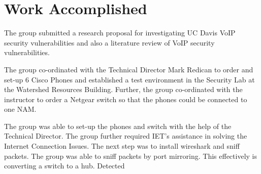\section{Work Accomplished}


The group submitted a research proposal for investigating UC Davis VoIP security vulnerabilities and also a literature review of VoIP security vulnerabilities.

 The group co-ordinated with the Technical Director Mark Redican to order and set-up 6 Cisco Phones and established a test environment in the Security Lab at the Watershed Resources Building. Further, the group co-ordinated with the instructor to order a Netgear switch so that the phones could be connected to one NAM.
 
 The group was able to set-up the phones and switch with the help of the Technical Director. The group further required IET's assistance in solving the Internet Connection Issues. 
 The next step was to install wireshark and sniff packets. The group was able to sniff packets by port mirroring. This effectively is converting a switch to a hub. Detected 
 